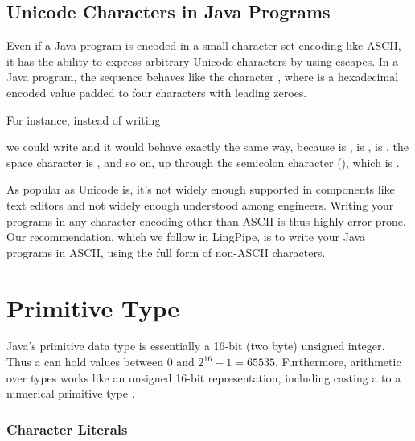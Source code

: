 \subsection{Unicode Characters in Java Programs}\label{section:char-unicode-java}

Even if a Java program is encoded in a small character set encoding
like ASCII, it has the ability to express arbitrary Unicode characters
by using escapes.  In a Java program, the sequence
  behaves like the character
, where  is a hexadecimal
encoded value padded to four characters with leading zeroes.

For instance, instead of writing

%
we could write
%
%
and it would behave exactly the same way, because  is
,  is ,  is
, the space character is , and so on, up
through the semicolon character (\charmention{;}), which is
.

As popular as Unicode is, it's not widely enough supported in
components like text editors and not widely enough understood among
engineers.  Writing your programs in any character encoding other than
ASCII is thus highly error prone.  Our recommendation, which we follow
in LingPipe, is to write your Java programs in ASCII, using the full
 form of non-ASCII characters.


\section{ Primitive Type}\label{section:char-primitive}

Java's primitive  data type is essentially a 16-bit (two
byte) unsigned integer. Thus a  can hold values between 0
and $2^16-1 = 65535$.  Furthermore, arithmetic over  types
works like an unsigned 16-bit representation, including casting a
 to a numerical primitive type .

\subsubsection{Character Literals}\label{section:character-literals}

